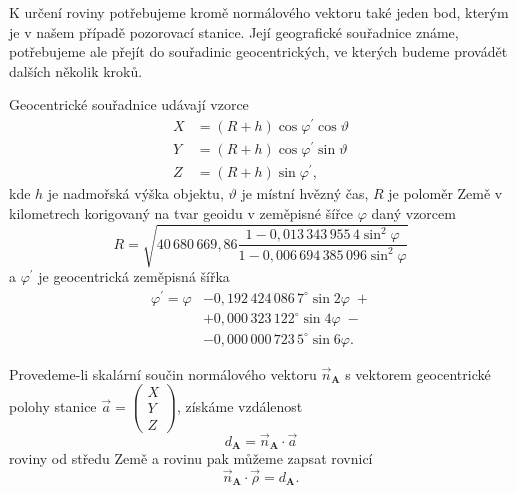\smallskip

K určení roviny potřebujeme kromě normálového vektoru také jeden bod, kterým je v našem případě pozorovací stanice. Její geografické souřadnice známe, potřebujeme ale přejít do souřadinic geocentrických, ve kterých budeme provádět dalších několik kroků.

Geocentrické souřadnice udávají vzorce \cite{ceplecha}
\begin{equation}
    \begin{aligned}
        X&=(R+h)\cos{\varphi^\prime}\cos{\vartheta}\\
        Y&=(R+h)\cos{\varphi^\prime}\sin{\vartheta}\\
        Z&=(R+h)\sin{\varphi^\prime}\text{,}
    \end{aligned}
    \label{eqn:geocentric}
\end{equation}
kde $h$ je nadmořská výška objektu, $\vartheta$ je místní hvězný čas, $R$ je poloměr Země v kilometrech korigovaný na tvar geoidu v zeměpisné šířce $\varphi$ daný vzorcem \cite{ceplecha}
\begin{equation}
    R=\sqrt{40\,680\,669{,}86\frac{1-0{,}013\,343\,955\,4 \sin^2{\varphi}}{1-0{,}006\,694\,385\,096 \sin^2{\varphi}}}
\end{equation}
a $\varphi^\prime$ je geocentrická zeměpisná šířka \cite{ceplecha}
\begin{equation}
    \begin{aligned}
        \varphi^\prime=\varphi&-0{,}192\,424\,086\,7^\circ \sin{2\varphi}\;+\\
        &+0{,}000\,323\,122^\circ \sin{4\varphi}\;-\\
        &-0{,}000\,000\,723\,5^\circ \sin{6\varphi}\text{.}
    \end{aligned}
\end{equation}

Provedeme-li skalární součin normálového vektoru $\vec{n}_\mathbf{A}$ s vektorem geocentrické polohy stanice $\vec{a}=\left(\begin{smallmatrix}
    X\\Y\\Z
\end{smallmatrix}\right)$, získáme vzdálenost
\begin{equation}
    d_\mathbf{A}=\vec{n}_\mathbf{A}\cdot\vec{a}
\end{equation}
roviny od středu Země \cite{ceplecha} a rovinu pak můžeme zapsat rovnicí \cite{ceplecha}
\begin{equation}
    \vec{n}_\mathbf{A}\cdot\vec{\rho}=d_\mathbf{A}\text{.}
    \label{eqn:photo:plane_a}
\end{equation}

